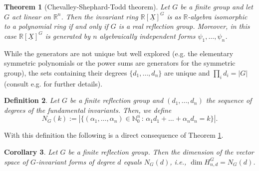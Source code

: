 \documentclass[11pt,a4paper]{amsart}
\numberwithin{equation}{section}
\newtheorem{thm}{Theorem}
\newtheorem{cor}[thm]{Corollary}
\newtheorem{definition}[thm]{Definition}
\theoremstyle{definition}
\newcommand{\N}{\mathbb{N}}
\newcommand{\R}{\mathbb{R}}
\numberwithin{thm}{section}
\theoremstyle{break}
\numberwithin{subcase}{case}
\begin{document}
\begin{thm}[Chevalley-Shephard-Todd theorem]\label{Thm:Chevalley-Shephard-Todd theorem}
Let $G$ be a finite group and let $G$ act linear on $\R^n$. Then the invariant ring $\R[\underline{X}]^G$ is as $\R$-algebra isomorphic to a polynomial ring if and only if $G$ is a real reflection group. Moreover, in this case $\R[\underline{X}]^G$ is generated by $n$ algebraically independent forms $\psi_1,\ldots,\psi_n$. 
\end{thm}
While the generators are not unique but well explored (e.g. the elementary symmetric polynomials or the power sums are generators for the symmetric group), the sets containing their degrees $\{d_1,\ldots,d_n\}$ are unique and $\prod_i d_i = |G|$ (consult e.g. \cite{humphreys1990reflection} for further details). 
\begin{definition}\label{def:ng}
Let $G$ be a finite reflection group and $(d_1,\ldots,d_n)$ the sequence of degrees of the fundamental invariants. Then, we define
$$N_G(k):=|\{ (\alpha_1,\ldots,\alpha_n)\in\N_0^n\,:\, \alpha_1 d_1+\ldots+\alpha_n d_n=k\}|.$$
\end{definition}
With this definition the following is a direct consequence of Theorem \ref{Thm:Chevalley-Shephard-Todd theorem}.
\begin{cor}
Let $G$ be a finite reflection group. Then 
the dimension of the vector space of $G$-invariant forms of degree $d$ equals $N_G(d)$, i.e., $\dim H_{n,d}^G=N_G(d)$. 
\end{cor}
\end{document}
